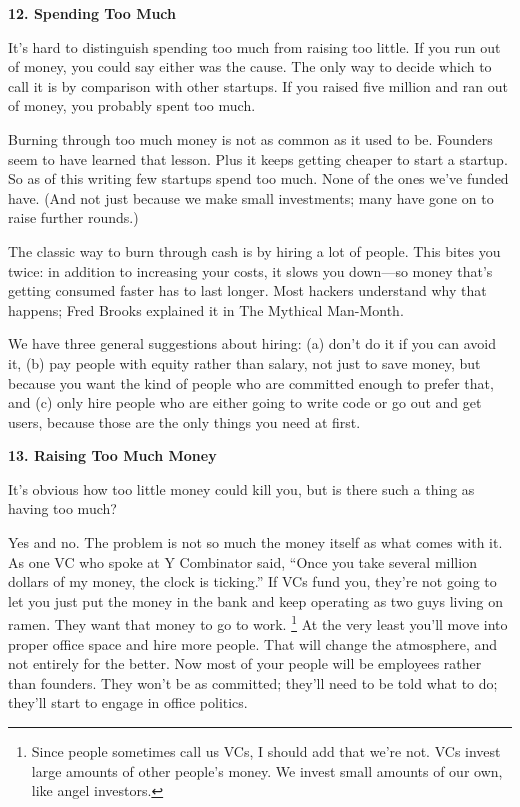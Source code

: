 \documentclass[12pt]{book}
\begin{document}
\textbf{12. Spending Too Much}

It's hard to distinguish spending too much from raising too little. If
you run out of money, you could say either was the cause. The only way
to decide which to call it is by comparison with other startups. If you
raised five million and ran out of money, you probably spent too much.

Burning through too much money is not as common as it used to be.
Founders seem to have learned that lesson. Plus it keeps getting cheaper
to start a startup. So as of this writing few startups spend too much.
None of the ones we've funded have. (And not just because we make small
investments; many have gone on to raise further rounds.)

The classic way to burn through cash is by hiring a lot of people. This
bites you twice: in addition to increasing your costs, it slows you
down---so money that's getting consumed faster has to last longer. Most
hackers understand why that happens; Fred Brooks explained it in The
Mythical Man-Month.

We have three general suggestions about hiring: (a) don't do it if you
can avoid it, (b) pay people with equity rather than salary, not just to
save money, but because you want the kind of people who are committed
enough to prefer that, and (c) only hire people who are either going to
write code or go out and get users, because those are the only things
you need at first.

\textbf{13. Raising Too Much Money}

It's obvious how too little money could kill you, but is there such a
thing as having too much?

Yes and no. The problem is not so much the money itself as what comes
with it. As one VC who spoke at Y Combinator said, ``Once you take
several million dollars of my money, the clock is ticking.'' If VCs fund
you, they're not going to let you just put the money in the bank and
keep operating as two guys living on ramen. They want that money to go
to work. \footnote{Since people sometimes call us VCs, I should add that we're not.
VCs invest large amounts of other people's money. We invest small
amounts of our own, like angel investors.} At the very least you'll move into
proper office space and hire more people. That will change the
atmosphere, and not entirely for the better. Now most of your people
will be employees rather than founders. They won't be as committed;
they'll need to be told what to do; they'll start to engage in office
politics.
\end{document}
